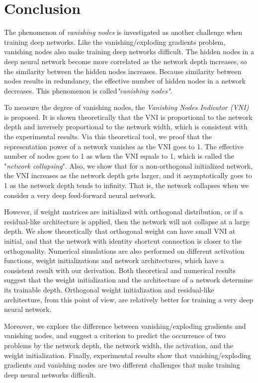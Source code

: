 \chapter{Conclusion} \label{conclusion}

The phenomenon of \textit{vanishing nodes} 
is investigated as another challenge when training deep networks.
Like the vanishing/exploding gradients problem, vanishing nodes also make training deep networks
difficult.
The hidden nodes in a deep neural network become more correlated as the network depth increases,
so the similarity between the hidden nodes increases.
Because similarity between nodes results in redundancy, the effective number of hidden nodes in a
network decreases.
This phenomenon is called\textit{"vanishing nodes"}.

To measure the degree of vanishing nodes, the \textit{Vanishing Nodes Indicator (VNI)} is proposed.
It is shown theoretically that the VNI is proportional to the network depth and inversely proportional
to the network width, which is consistent with the experimental results.
Via this theoretical tool,
we proof that the representation power of a network vanishes as the VNI goes to 1.
The effective number of nodes goes to 1 as when the VNI equals to 1, which is called
the "\textit{network collapsing}".
Also, we show that for a non-orthogonal initialized network, the VNI increases as the network
depth gets larger, and it asymptotically goes to 1 as the network depth tends to infinity.
That is, the network collapses when we consider a very deep feed-forward neural network.

However, if weight matrices are initialized with orthogonal distribution, or if a residual-like
architecture is applied, then the network will not collapse at a large depth.
We show theoretically that orthogonal weight can have small VNI at initial, and that
the network with identity shortcut connection is closer to the orthogonality.
Numerical simulations are also performed on different activation functions, weight initializations
and network architectures, which have a consistent result with our derivation.
Both theoretical and numerical results suggest that the weight initialization and the architecture
of a network determine its trainable depth.
Orthogonal weight initialization and residual-like architecture, from this point of view, are
relatively better for training a very deep neural network.

Moreover, we explore the difference between vanishing/exploding gradients and vanishing nodes,
and suggest a criterion to predict the occurrence of two problems by the network depth,
the network width, the activation, and the weight initialization. 
Finally, experimental results show that vanishing/exploding gradients and vanishing nodes are two
different challenges that make training deep neural networks difficult. 
